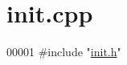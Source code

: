 \hypertarget{init_8cpp_source}{}\section{init.\+cpp}
\label{init_8cpp_source}

\begin{DoxyCode}
00001 \textcolor{preprocessor}{#include "\mbox{\hyperlink{init_8h}{init.h}}"}
\end{DoxyCode}
